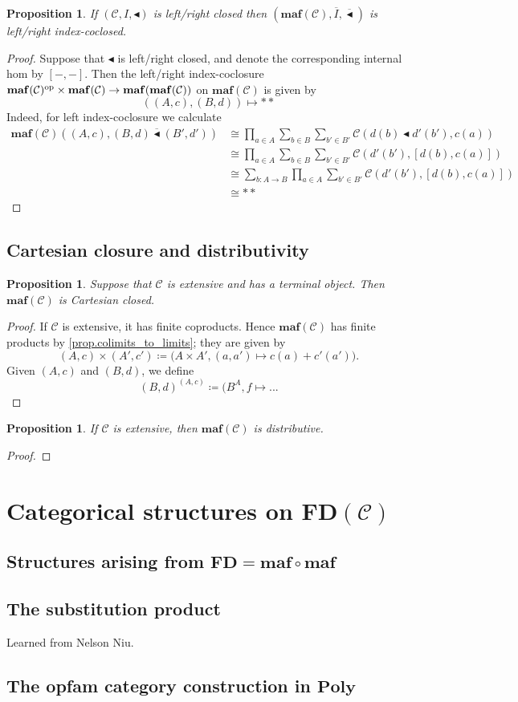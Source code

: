 \documentclass[11pt, one side, article]{memoir}
\theoremstyle{definition}
\theoremstyle{plain}
\newtheorem{proposition}[definitionx]{Proposition}
\newcommand{\cat}[1]{\mathcal{#1}}%
\newcommand{\Cat}[1]{\mathbf{#1}}%
\newcommand{\op}{^\tn{op}}
\newcommand{\tn}[1]{\textnormal{#1}}
\newcommand{\ol}[1]{\overline{#1}}
\newcommand{\poly}{\Cat{Poly}}
\newcommand{\0}{\Cat{0}}
\newcommand{\1}{\Cat{1}}
\newcommand{\olmonprod}{\mathbin{\ol{\monprod}}}
\newcommand{\monprod}{\blacktriangleleft}
\newcommand{\fd}{\Cat{FD}}
\newcommand{\opfam}{\Cat{maf}}
\begin{document}
\begin{proposition}
If $(\cat{C},I,\monprod)$ is left/right closed then $(\opfam(\cat{C}),\ol{I},\olmonprod)$ is left/right index-coclosed.
\end{proposition}
\begin{proof}
Suppose that $\monprod$ is left/right closed, and denote the corresponding internal hom by $[-,-]$. Then the left/right index-coclosure $\opfam(\cat{C})\op\times\opfam(\cat{C})\to\opfam(\opfam(\cat{C}))$ on $\opfam(\cat{C})$ is given by
\[
((A,c),(B,d))\mapsto**
\]
Indeed, for left index-coclosure we calculate
\begin{align*}
  \opfam(\cat{C})((A,c),(B,d)\olmonprod(B',d'))&\cong
  \prod_{a\in A}\sum_{b\in B}\sum_{b'\in B'}\cat{C}(d(b)\monprod d'(b'), c(a))\\&\cong
  \prod_{a\in A}\sum_{b\in B}\sum_{b'\in B'}\cat{C}(d'(b'), [d(b),c(a)])\\&\cong
  \sum_{b\colon A\to B}\prod_{a\in A}\sum_{b'\in B'}\cat{C}(d'(b'), [d(b),c(a)])\\&\cong
**
\end{align*}
\end{proof}

\section{Cartesian closure and distributivity}

\begin{proposition}
Suppose that $\cat{C}$ is extensive and has a terminal object. Then $\opfam(\cat{C})$ is Cartesian closed.
\end{proposition}
\begin{proof}
If $\cat{C}$ is extensive, it has finite coproducts. Hence $\opfam(\cat{C})$ has finite products by \cref{prop.colimits_to_limits}; they are given by
\[
(A,c)\times (A',c')\coloneqq\big(A\times A', (a,a')\mapsto c(a)+c'(a')\big).
\]
Given $(A,c)$ and $(B,d)$, we define
\[
(B,d)^{(A,c)}\coloneqq(B^A, f\mapsto ...
\]
\end{proof}

\begin{proposition}
If $\cat{C}$ is extensive, then $\opfam(\cat{C})$ is distributive.
\end{proposition}
\begin{proof}

\end{proof}

\chapter{Categorical structures on $\fd(\cat{C})$}
\section{Structures arising from $\fd=\opfam\circ\opfam$}
\section{The substitution product}

Learned from Nelson Niu.

\section{The opfam category construction in $\poly$}



\printbibliography
\end{document}
